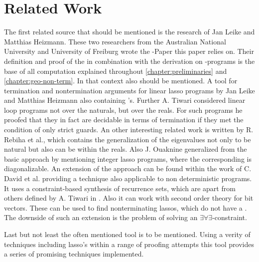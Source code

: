 \chapter{Related Work}
\label{chapter:related-work}

The first related source that should be mentioned is the research of Jan Leike and Matthias Heizmann. These two researchers from the Australian National University and University of Freiburg wrote the \gna-Paper this paper relies on. Their definition and proof of the \gna in combination with the derivation on \lasso-programs is the base of all computation explained throughout \autoref{chapter:preliminaries} and \autoref{chapter:geo-non-term}. \cite{leike2014geometric} \newline
In that context also  should be mentioned. A tool for termination and nontermination arguments for linear lasso programs by Jan Leike and Matthias Heizmann also containing \gna's. \cite{LassoRanker}\newline
Further A. Tiwari considered linear loop programs not over the naturals, but over the reals. For such programs he proofed that they in fact are decidable in terms of termination if they met the condition of only strict guards. \cite{tiwari2004termination} \newline
An other interesting related work is written by R. Rebiha et al., which contains the generalization of the eigenvalues not only to be natural but also can be within the reals. \cite{rebiha2014characterization} Also J. Ouaknine generalized from the basic approach by mentioning integer lasso programs, where the corresponding \updatematrix is diagonalizable. \cite{ouaknine2014termination} \newline
An extension of the \gna approach can be found within the work of C. David et al. providing a technique also applicable to non deterministic programs. It uses a constraint-based synthesis of recurrence sets, which are apart from others defined by A. Tiwari in \cite{tiwari2004termination}. Also it can work with second order theory for bit vectors. These can be used to find nonterminating lassos, which do not have a \gna. The downside of such an extension is the problem of solving an $\exists\forall\exists$-constraint. \cite{david2015unrestricted} \cite{leike2014geometric}

Last but not least the often mentioned tool \aprove is to be mentioned. Using a verity of techniques including lasso's within a range of proofing attempts this tool provides a series of promising techniques implemented. 

